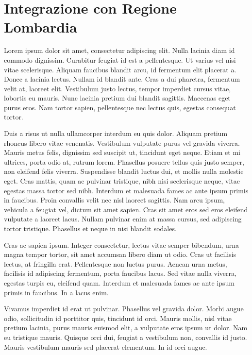 \section{Integrazione con Regione Lombardia}

Lorem ipsum dolor sit amet, consectetur adipiscing elit. Nulla lacinia diam id commodo dignissim. Curabitur feugiat id est a pellentesque. Ut varius vel nisi vitae scelerisque. Aliquam faucibus blandit arcu, id fermentum elit placerat a. Donec a lacinia lectus. Nullam id blandit ante. Cras a dui pharetra, fermentum velit at, laoreet elit. Vestibulum justo lectus, tempor imperdiet cursus vitae, lobortis eu mauris. Nunc lacinia pretium dui blandit sagittis. Maecenas eget purus eros. Nam tortor sapien, pellentesque nec lectus quis, egestas consequat tortor.

Duis a risus ut nulla ullamcorper interdum eu quis dolor. Aliquam pretium rhoncus libero vitae venenatis. Vestibulum vulputate purus vel gravida viverra. Mauris metus felis, dignissim sed suscipit ut, tincidunt eget neque. Etiam et mi ultrices, porta odio at, rutrum lorem. Phasellus posuere tellus quis justo semper, non eleifend felis viverra. Suspendisse blandit luctus dui, et mollis nulla molestie eget. Cras mattis, quam ac pulvinar tristique, nibh nisi scelerisque neque, vitae egestas massa tortor sed nibh. Interdum et malesuada fames ac ante ipsum primis in faucibus. Proin convallis velit nec nisl laoreet sagittis. Nam arcu ipsum, vehicula a feugiat vel, dictum sit amet sapien. Cras sit amet eros sed eros eleifend vulputate a laoreet lacus. Nullam pulvinar enim at massa cursus, sed adipiscing tortor tristique. Phasellus et neque in nisi blandit sodales.

Cras ac sapien ipsum. Integer consectetur, lectus vitae semper bibendum, urna magna tempor tortor, sit amet accumsan libero diam ut odio. Cras ut facilisis lectus, at fringilla erat. Pellentesque non luctus purus. Aenean urna metus, facilisis id adipiscing fermentum, porta faucibus lacus. Sed vitae nulla viverra, egestas turpis eu, eleifend quam. Interdum et malesuada fames ac ante ipsum primis in faucibus. In a lacus enim.

Vivamus imperdiet id erat ut pulvinar. Phasellus vel gravida dolor. Morbi augue odio, sollicitudin id porttitor quis, tincidunt id orci. Mauris mollis, nisl vitae pretium lacinia, purus mauris euismod elit, a vulputate eros ipsum ut dolor. Nam eu tristique mauris. Quisque orci dui, feugiat a vestibulum non, convallis id justo. Mauris vestibulum mauris sed placerat elementum. In id orci augue. 